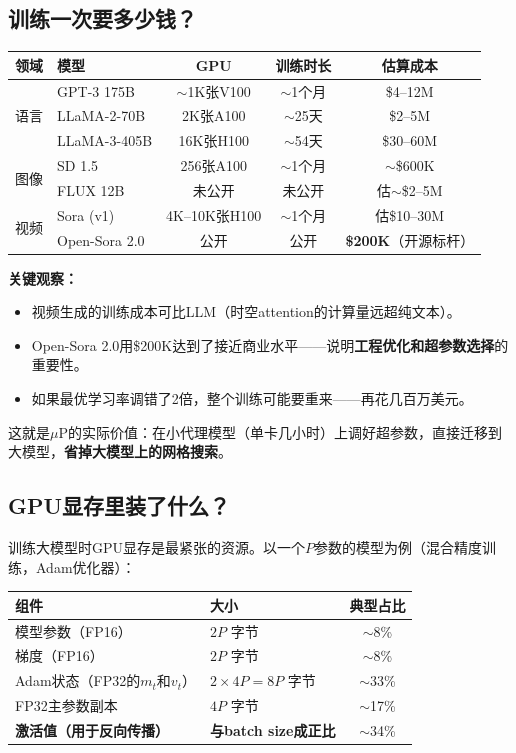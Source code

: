 \documentclass[11pt,a4paper]{article}
\begin{document}
\subsection*{训练一次要多少钱？}

\begin{center}
\renewcommand{\arraystretch}{1.3}
\begin{tabular}{llccc}
\toprule
领域 & 模型 & GPU & 训练时长 & 估算成本 \\
\midrule
\multirow{3}{*}{语言} & GPT-3 175B & $\sim$1K张V100 & $\sim$1个月 & \$4--12M \\
& LLaMA-2-70B & 2K张A100 & $\sim$25天 & \$2--5M \\
& LLaMA-3-405B & 16K张H100 & $\sim$54天 & \$30--60M \\
\midrule
\multirow{2}{*}{图像} & SD 1.5 & 256张A100 & $\sim$1个月 & $\sim$\$600K \\
& FLUX 12B & 未公开 & 未公开 & 估$\sim$\$2--5M \\
\midrule
\multirow{2}{*}{视频} & Sora (v1) & 4K--10K张H100 & $\sim$1个月 & 估\$10--30M \\
& Open-Sora 2.0 & 公开 & 公开 & \textbf{\$200K}（开源标杆） \\
\bottomrule
\end{tabular}
\end{center}

\textbf{关键观察：}
\begin{itemize}[leftmargin=*]
\item 视频生成的训练成本可比LLM（时空attention的计算量远超纯文本）。
\item Open-Sora 2.0用\$200K达到了接近商业水平——说明\textbf{工程优化和超参数选择}的重要性。
\item 如果最优学习率调错了2倍，整个训练可能要重来——再花几百万美元。
\end{itemize}

这就是$\mu$P的实际价值：在小代理模型（单卡几小时）上调好超参数，直接迁移到大模型，\textbf{省掉大模型上的网格搜索}。

\subsection*{GPU显存里装了什么？}

训练大模型时GPU显存是最紧张的资源。以一个$P$参数的模型为例（混合精度训练，Adam优化器）：

\begin{center}
\renewcommand{\arraystretch}{1.3}
\begin{tabular}{llc}
\toprule
组件 & 大小 & 典型占比 \\
\midrule
模型参数（FP16） & $2P$ 字节 & $\sim$8\% \\
梯度（FP16） & $2P$ 字节 & $\sim$8\% \\
Adam状态（FP32的$m_t$和$v_t$） & $2\times 4P = 8P$ 字节 & $\sim$33\% \\
FP32主参数副本 & $4P$ 字节 & $\sim$17\% \\
\textbf{激活值（用于反向传播）} & \textbf{与batch size成正比} & $\sim$34\% \\
\bottomrule
\end{tabular}
\end{center}
\end{document}
